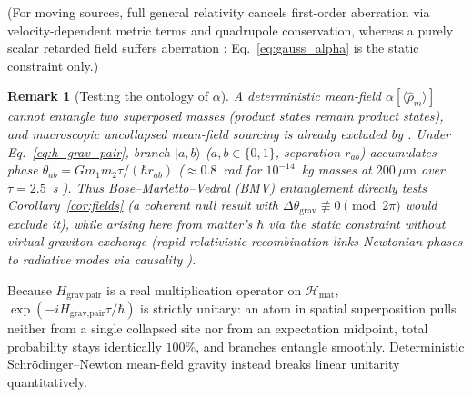\documentclass[aps,prd,onecolumn,tightenlines,nofootinbib,notitlepage,10pt,floatfix]{revtex4-2}
\theoremstyle{indentedtheorem}
\newtheorem{remark}{Remark}
\begin{document}
\noindent (For moving sources, full general relativity cancels first-order aberration via velocity-dependent metric terms and quadrupole conservation, whereas a purely scalar retarded field suffers aberration \citep{Carlip2000Aberration}; Eq.~\eqref{eq:gauss_alpha} is the static constraint only.)

\begin{remark}[Testing the ontology of $\alpha$]\label{rem:lapse_test}
A deterministic mean-field $\alpha[\langle\hat{\rho}_m\rangle]$ cannot entangle two superposed masses (product states remain product states), and macroscopic uncollapsed mean-field sourcing is already excluded by \citet{PageGeilker1981Indirect}. Under Eq.~\eqref{eq:h_grav_pair}, branch $|a,b\rangle$ ($a,b\in\{0,1\}$, separation $r_{ab}$) accumulates phase $\theta_{ab}=Gm_1 m_2\tau/(\hbar r_{ab})$ ($\approx 0.8$~rad for $10^{-14}$~kg masses at $200~\mu\text{m}$ over $\tau=2.5$~s \citep{Bose2017Spin}). Thus Bose--Marletto--Vedral (BMV) entanglement \citep{Bose2017Spin,Marletto2017Gravitationally} directly tests Corollary~\ref{cor:fields} (a coherent null result with $\Delta\theta_\text{grav}\not\equiv 0\pmod{2\pi}$ would exclude it), while arising here from matter's $\hbar$ via the static constraint without virtual graviton exchange \citep{Anastopoulos2018Comment,Christodoulou2019Possibility} (rapid relativistic recombination links Newtonian phases to radiative modes via causality \citep{DanielsonSatishchandranWald2022}).
\end{remark}

Because $H_\text{grav,pair}$ is a real multiplication operator on $\mathcal{H}_\text{mat}$, $\exp(-iH_\text{grav,pair}\tau/\hbar)$ is strictly unitary: an atom in spatial superposition pulls neither from a single collapsed site nor from an expectation midpoint, total probability stays identically $100\%$, and branches entangle smoothly. Deterministic Schr\"odinger--Newton mean-field gravity instead breaks linear unitarity quantitatively.
\end{document}

